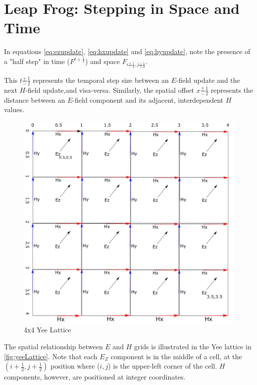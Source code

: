 \section{Leap Frog: Stepping in Space and Time}

In equations \ref{eq:ezupdate}, \ref{eq:hxupdate} and \ref{eq:hyupdate}, note the presence of a "half step" in time ($F^{t + \frac{1}{2}}$) and space $F_{i \frac{+}{-}\frac{1}{2},j \frac{-}{+}\frac{1}{2}}$.

This $t\frac{+}{-}\frac{1}{2}$ represents the temporal step size between an $E$-field update and the next $H$-field update,and visa-versa. Similarly, the spatial offset $x\frac{+}{-}\frac{1}{2}$ represents the distance between an $E$-field component and its adjacent, interdependent $H$ values.


\begin{figure}[H]
	\centering
	\includegraphics[width=15cm,keepaspectratio]{YeeMesh.png}
	\caption{4x4 Yee Lattice}
	\label{fig:yeeLattice}
\end{figure}

The spatial relationship between $E$ and $H$ grids is illustrated in the Yee lattice in \autoref{fig:yeeLattice}. Note that each $E_Z$ component is in the middle of a cell, at the $(i + \frac{1}{2}, j + \frac{1}{2})$ position where ($i,j$) is  the upper-left corner of the cell. $H$ components, however, are positioned at integer coordinates.

